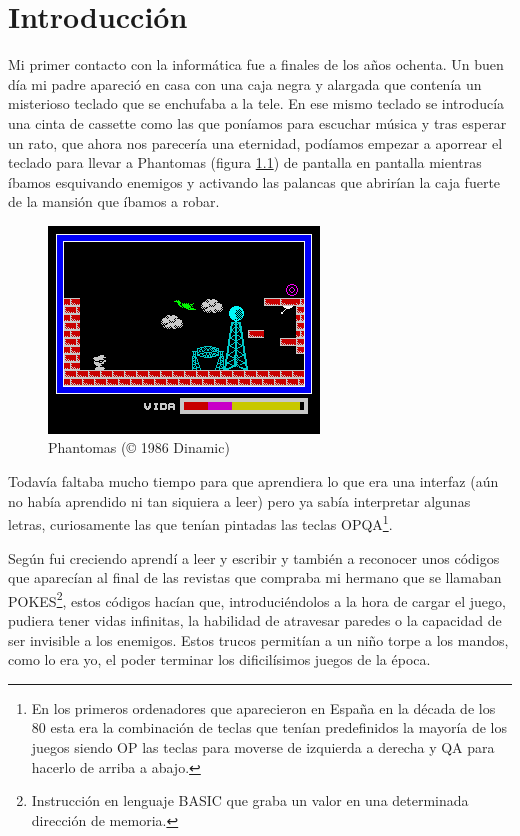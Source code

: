 \chapter{Introducción}

Mi primer contacto con la informática fue a finales de los años ochenta. Un buen día mi padre apareció en casa con una caja negra y alargada que contenía un misterioso teclado que se enchufaba a la tele. En ese mismo teclado se introducía una cinta de cassette como las que poníamos para escuchar música y tras esperar un rato, que ahora nos parecería una eternidad, podíamos empezar a aporrear el teclado para llevar a Phantomas (figura \ref{fig:phantomas}) de pantalla en pantalla mientras íbamos esquivando enemigos y activando las palancas que abrirían la caja fuerte de la mansión que íbamos a robar.


\begin{figure}[h!]
\centering
\includegraphics{../screenshots/phantomas-sp1}
\caption{Phantomas (© 1986 Dinamic)}
\label{fig:phantomas}
\end{figure}

\bigskip
Todavía faltaba mucho tiempo para que aprendiera lo que era una interfaz (aún no había aprendido ni tan siquiera a leer) pero ya sabía interpretar algunas letras, curiosamente las que tenían pintadas las teclas OPQA\footnote{En los primeros ordenadores que aparecieron en España en la década de los 80 esta era la combinación de teclas que tenían predefinidos la mayoría de los juegos siendo OP las teclas para moverse de izquierda a derecha y QA para hacerlo de arriba a abajo.}.

\bigskip
Según fui creciendo aprendí a leer y escribir y también a reconocer unos códigos que aparecían al final de las revistas que compraba mi hermano que se llamaban POKES\footnote{Instrucción en lenguaje BASIC que graba un valor en una determinada dirección de memoria.}, estos códigos hacían que, introduciéndolos a la hora de cargar el juego, pudiera tener vidas infinitas, la habilidad de atravesar paredes o la capacidad de ser invisible a los enemigos. Estos trucos permitían a un niño torpe a los mandos, como lo era yo, el poder terminar los dificilísimos juegos de la época.

